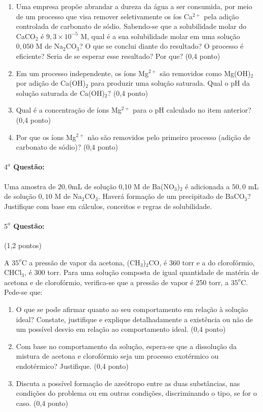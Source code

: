 \documentclass[12pt,a4paper]{article}
\begin{document}
\begin{enumerate}[label=(\alph*)]
\item Uma empresa propõe abrandar a dureza da água a ser consumida, por meio de um processo que visa remover seletivamente os íos Ca$^{2+}$
pela adição controlada de carbonato de sódio. Sabendo-se que a solubilidade molar do CaCO$_2$ é $9,3 \times 10^{-5}$ M, qual é a sua solubilidade
molar em uma solução $0,050$ M de Na$_2$CO$_3$? O que se conclui diante do resultado? O processo é eficiente? Seria de se esperar esse resultado? Por que? (0,4 ponto)
\item Em um processo independente, os íons Mg$^{2+}$ são removidos como Mg(OH)$_2$ por adição de Ca(OH)$_2$ para produzir uma solução saturada. Qual o pH da solução saturada de 
Ca(OH)$_2$? (0,4 ponto)
\item Qual é a concentração de íons Mg$^{2+}$ para o pH calculado no item anterior? (0,4 ponto)
\item Por que os íons Mg$^{2+}$ não são removidos pelo primeiro processo (adição de carbonato de sódio)? (0,4 ponto)
\end{enumerate}

\paragraph{$4^a$ Questão:}

Uma amostra de $20,0$mL de solução 0,10 M de Ba(NO$_3$)$_2$ é adicionada a $50,0$ mL de solução $0,10$ M de Na$_2$CO$_3$. Haverá 
formação de um precipitado de BaCO$_3$? Justifique com base em cálculos, conceitos e regras de solubilidade.

\paragraph{$5^a$ Questão:} (1,2 pontos)

A $35^o$C a pressão de vapor da acetona, (CH$_3$)$_2$CO, é $360$ torr e a do clorofórmio, CHCl$_3$, é 300 torr. Para uma solução
composta de igual quantidade de matéria de acetona e de clorofórmio, verifica-se que a pressão de vapor é 250 torr, a $35^o$C. Pede-se que:

\begin{enumerate}[label=(\alph*)]
\item O que se pode afirmar quanto ao seu comportamento em relação à solução ideal? Constate, justifique e explique detalhadamente a existência
ou não de um possível desvio em relação ao comportamento ideal. (0,4 ponto)
\item Com base no comportamento da solução, espera-se que a dissolução da mistura de acetona e clorofórmio seja um processo exotérmico ou endotérmico? Justifique. (0,4 ponto)
\item Discuta a possível formação de azeótropo entre as duas substâncias, nas condições do problema ou em outras condições, discriminando o tipo, se for o caso. (0,4 ponto)

\end{enumerate}
\end{document}

